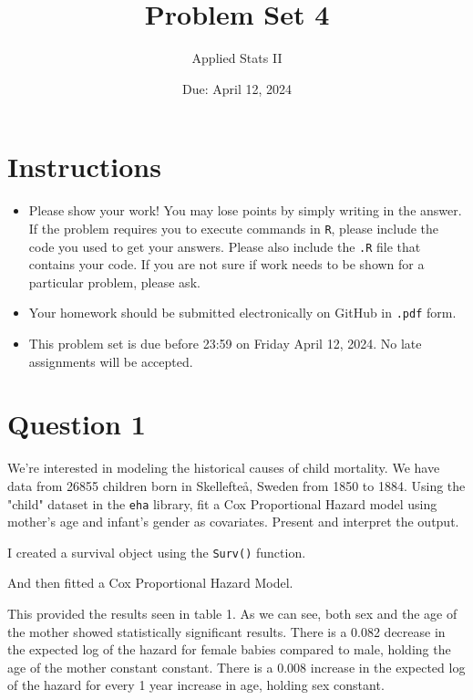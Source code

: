 \documentclass[12pt,letterpaper]{article}
\title{Problem Set 4}
\date{Due: April 12, 2024}
\author{Applied Stats II}
\begin{document}
	\maketitle
	\section*{Instructions}
	\begin{itemize}
	\item Please show your work! You may lose points by simply writing in the answer. If the problem requires you to execute commands in \texttt{R}, please include the code you used to get your answers. Please also include the \texttt{.R} file that contains your code. If you are not sure if work needs to be shown for a particular problem, please ask.
	\item Your homework should be submitted electronically on GitHub in \texttt{.pdf} form.
	\item This problem set is due before 23:59 on Friday April 12, 2024. No late assignments will be accepted.

	\end{itemize}

	\vspace{.25cm}
\section*{Question 1}
\vspace{.25cm}
\noindent We're interested in modeling the historical causes of child mortality. We have data from 26855 children born in Skellefteå, Sweden from 1850 to 1884. Using the "child" dataset in the \texttt{eha} library, fit a Cox Proportional Hazard model using mother's age and infant's gender as covariates. Present and interpret the output.

I created a survival object using the \texttt{Surv()} function.
	 

And then fitted a Cox Proportional Hazard Model.

	 

This provided the results seen in table 1. As we can see, both sex and the age of the mother showed statistically significant results. There is a 0.082 decrease in the expected log of the hazard for female babies compared to male, holding the age of the mother constant constant. There is a 0.008 increase in the expected log of the hazard for every 1 year increase in age, holding sex constant.
\end{document}
